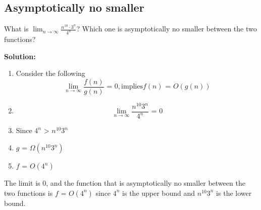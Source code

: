 \documentclass[11pt,fleqn]{book}
\begin{document}
\subsection{Asymptotically no smaller}
\begin{example}
 What is $\lim_{n \to \infty} \frac{n^{10}\cdot 3^n}{4^n}$?  Which one is asymptotically no smaller between the two functions?
\end{example}
\textbf{Solution:}
\begin{enumerate}
    \item Consider the following \\
    $$\lim_{n \to \infty} \frac{f(n)}{g(n)} \text{ = } 0, \text{implies} f(n) \text{ = } O(g(n))$$
    \item $$\lim_{n \to \infty} \frac{n^{10}3^n}{4^n} \text{ = } 0 $$
    \item Since $4^n\text{ > } n^{10}3^n$
    \item $g \text{ = } \Omega(n^{10}3^n)$
    \item $f \text{ = } O(4^n)$
\end{enumerate}
The limit is $0$, and the function that is asymptotically no smaller between the two functions is $f \text{ = } O(4^n)$ since $4^n$ is the upper bound and $n^{10}3^n$ is the lower bound. 
\end{document}
